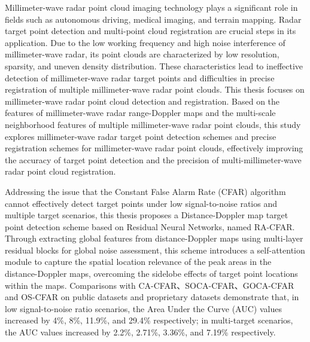 Millimeter-wave radar point cloud imaging technology plays a significant role in fields such as autonomous driving, medical imaging, and terrain mapping. Radar target point detection and multi-point cloud registration are crucial steps in its application. Due to the low working frequency and high noise interference of millimeter-wave radar, its point clouds are characterized by low resolution, sparsity, and uneven density distribution. These characteristics lead to ineffective detection of millimeter-wave radar target points and difficulties in precise registration of multiple millimeter-wave radar point clouds. This thesis focuses on millimeter-wave radar point cloud detection and registration. Based on the features of millimeter-wave radar range-Doppler maps and the multi-scale neighborhood features of multiple millimeter-wave radar point clouds, this study explores millimeter-wave radar target point detection schemes and precise registration schemes for millimeter-wave radar point clouds, effectively improving the accuracy of target point detection and the precision of multi-millimeter-wave radar point cloud registration.

Addressing the issue that the Constant False Alarm Rate (CFAR) algorithm cannot effectively detect target points under low signal-to-noise ratios and multiple target scenarios, this thesis proposes a Distance-Doppler map target point detection scheme based on Residual Neural Networks, named RA-CFAR. Through extracting global features from distance-Doppler maps using multi-layer residual blocks for global noise assessment, this scheme introduces a self-attention module to capture the spatial location relevance of the peak areas in the distance-Doppler maps, overcoming the sidelobe effects of target point locations within the maps. Comparisons with CA-CFAR、SOCA-CFAR、GOCA-CFAR and OS-CFAR on public datasets and proprietary datasets demonstrate that, in low signal-to-noise ratio scenarios, the Area Under the Curve (AUC) values increased by 4\%, 8\%, 11.9\%, and 29.4\% respectively; in multi-target scenarios, the AUC values increased by 2.2\%, 2.71\%, 3.36\%, and 7.19\% respectively.

